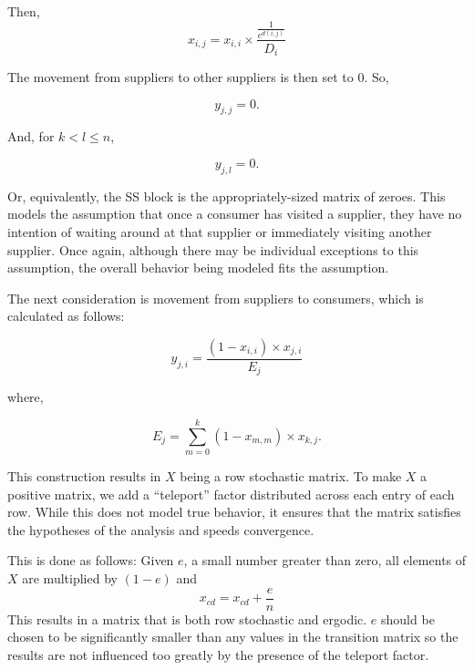 \documentclass[twoside,twocolumn]{article}
\begin{document}
Then,
$$x_{i,j} = x_{i,i} \times \frac{\frac{1}{e^{d(i,j)}}}{D_i}$$

The movement from suppliers to other suppliers is then set to 0.
So,

$$y_{j,j} = 0.$$

And, for $k < l \leq n$,

$$y_{j,l} = 0.$$

Or, equivalently, the SS block is the appropriately-sized matrix of zeroes.
This models the assumption that once a consumer has visited a supplier, they have no intention of waiting around at that supplier or immediately visiting another supplier.
Once again, although there may be individual exceptions to this assumption, the overall behavior being modeled fits the assumption.

The next consideration is movement from suppliers to consumers, which is calculated as follows:

$$y_{j,i} = \frac{(1-x_{i,i})\times x_{j,i}}{E_j}$$

where, 

$$E_j = \sum_{m=0}^{k} (1-x_{m,m})\times x_{k,j}.$$


This construction results in $X$ being a row stochastic matrix.
To make $X$ a positive matrix, we add a ``teleport'' factor distributed across each entry of each row.
While this does not model true behavior, it ensures that the matrix satisfies the hypotheses of the analysis and speeds convergence.

This is done as follows:
Given $e$, a small number greater than zero, all elements of $X$ are multiplied by $(1-e)$ and 
$$x_{cd} = x_{cd} + \frac{e}{n}$$
This results in a matrix that is both row stochastic and ergodic.%
$e$ should be chosen to be significantly smaller than any values in the transition matrix so the results are not influenced too greatly by the presence of the teleport factor.
    
\end{document}
